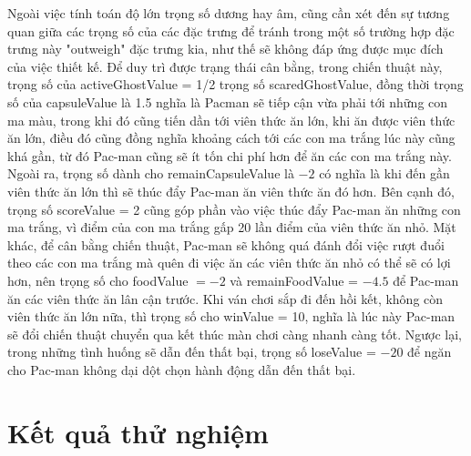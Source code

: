 \documentclass[12pt, a4paper]{article}
\begin{document}
Ngoài việc tính toán độ lớn trọng số dương hay âm, cũng cần xét đến sự tương quan giữa các trọng số của các đặc trưng để tránh trong một số trường hợp đặc trưng này "outweigh" đặc trưng kia, như thế sẽ không đáp ứng được mục đích của việc thiết kế. Để duy trì được trạng thái cân bằng, trong chiến thuật này, trọng số của activeGhostValue = 1/2 trọng số scaredGhostValue, đồng thời trọng số của capsuleValue là 1.5 nghĩa là Pacman sẽ tiếp cận vừa phải tới những con ma màu, trong khi đó cũng tiến dần tới viên thức ăn lớn, khi ăn được viên thức ăn lớn, điều đó cũng đồng nghĩa khoảng cách tới các con ma trắng lúc này cũng khá gần, từ đó Pac-man cũng sẽ ít tốn chi phí hơn để ăn các con ma trắng này. Ngoài ra, trọng số dành cho remainCapsuleValue là $-2$ có nghĩa là khi đến gần viên thức ăn lớn thì sẽ thúc đẩy Pac-man ăn viên thức ăn đó hơn. Bên cạnh đó, trọng số scoreValue = 2 cũng góp phần vào việc thúc đẩy Pac-man ăn những con ma trắng, vì điểm của con ma trắng gấp 20 lần điểm của viên thức ăn nhỏ. Mặt khác, để cân bằng chiến thuật, Pac-man sẽ không quá đánh đổi việc rượt đuổi theo các con ma trắng mà quên đi việc ăn các viên thức ăn nhỏ có thể sẽ có lợi hơn, nên trọng số cho foodValue $= -2$ và remainFoodValue = $-4.5$ để Pac-man ăn các viên thức ăn lân cận trước. Khi ván chơi sắp đi đến hồi kết, không còn viên thức ăn lớn nữa, thì trọng số cho winValue = 10, nghĩa là lúc này Pac-man sẽ đổi chiến thuật chuyển qua kết thúc màn chơi càng nhanh càng tốt. Ngược lại, trong những tình huống sẽ dẫn đến thất bại, trọng số loseValue = $-20$ để ngăn cho Pac-man không dại dột chọn hành động dẫn đến thất bại.

\section{Kết quả thử nghiệm}
\end{document}
